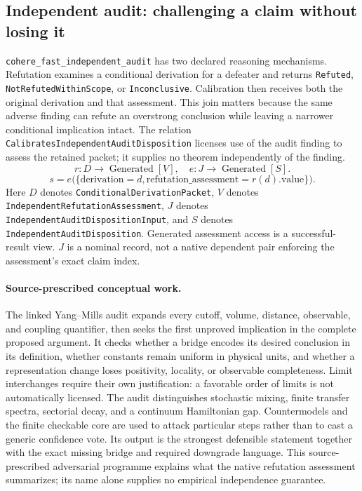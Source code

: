 \subsection{Independent audit: challenging a claim without losing it}
\label{app:granular-cohere_fast_independent_audit}
\texttt{cohere\_fast\_independent\_audit} has two declared reasoning mechanisms. Refutation examines a conditional derivation for a defeater and returns \texttt{Refuted}, \texttt{Not\allowbreak Refuted\allowbreak Within\allowbreak Scope}, or \texttt{Inconclusive}. Calibration then receives both the original derivation and that assessment. This join matters because the same adverse finding can refute an overstrong conclusion while leaving a narrower conditional implication intact. The relation \texttt{Calibrates\allowbreak Independent\allowbreak Audit\allowbreak Disposition} licenses use of the audit finding to assess the retained packet; it supplies no theorem independently of the finding.
\[
 r:D\to\operatorname{Generated}[V],\quad
 e:J\to\operatorname{Generated}[S].
\]
\[
 s=e\bigl(\{\mathrm{derivation}=d,\mathrm{refutation\_assessment}=r(d).\mathrm{value}\}\bigr).
\]
Here $D$ denotes \texttt{Conditional\allowbreak Derivation\allowbreak Packet}, $V$ denotes \texttt{Independent\allowbreak Refutation\allowbreak Assessment}, $J$ denotes \texttt{Independent\allowbreak Audit\allowbreak Disposition\allowbreak Input}, and $S$ denotes \texttt{Independent\allowbreak Audit\allowbreak Disposition}. Generated assessment access is a successful-result view. $J$ is a nominal record, not a native dependent pair enforcing the assessment's exact claim index.

\paragraph{Source-prescribed conceptual work.}
The linked Yang--Mills audit expands every cutoff, volume, distance, observable, and coupling quantifier, then seeks the first unproved implication in the complete proposed argument. It checks whether a bridge encodes its desired conclusion in its definition, whether constants remain uniform in physical units, and whether a representation change loses positivity, locality, or observable completeness. Limit interchanges require their own justification: a favorable order of limits is not automatically licensed. The audit distinguishes stochastic mixing, finite transfer spectra, sectorial decay, and a continuum Hamiltonian gap. Countermodels and the finite checkable core are used to attack particular steps rather than to cast a generic confidence vote. Its output is the strongest defensible statement together with the exact missing bridge and required downgrade language. This source-prescribed adversarial programme explains what the native refutation assessment summarizes; its name alone supplies no empirical independence guarantee.

